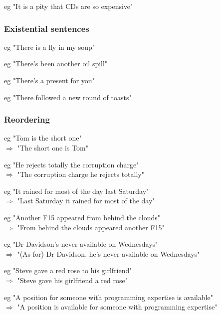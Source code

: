 eg "It is a pity that CDs are so expensive"

\subsubsection{Existential sentences}

eg "There is a fly in my soup"

eg "There's been another oil spill"

eg "There's a present for you"

eg "There followed a new round of toasts"

\subsubsection{Reordering}


eg "Tom is the short one"\\
$\Longrightarrow$ "The short one is Tom"


eg "He rejects totally the corruption charge"\\
$\Longrightarrow$  "The corruption charge he rejects totally"

eg "It rained for most of the day last Saturday"\\
$\Longrightarrow$  "Last Saturday it rained for most of the day"


eg "Another F15 appeared from behind the clouds"\\
$\Longrightarrow$  "From behind the clouds appeared another F15"


eg "Dr Davidson's never available on Wednesdays"\\
$\Longrightarrow$  "(As for) Dr Davidson, he's never available on Wednesdays"


eg "Steve gave a red rose to his girlfriend"\\
$\Longrightarrow$  "Steve gave his girlfriend a red rose"


eg "A position for someone with programming expertise is available"\\
$\Longrightarrow$  "A position is available for someone with programming expertise"

